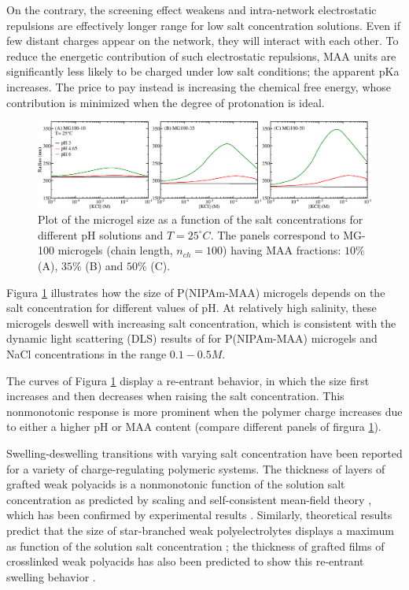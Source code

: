 On the contrary, the screening effect weakens and intra-network electrostatic repulsions are effectively longer range for low salt concentration solutions.
Even if few distant charges appear on the network, they will interact with each other.
To reduce the energetic contribution of such electrostatic repulsions, MAA units are significantly less likely to be charged under low salt conditions;
the apparent pKa increases.
The price to pay instead is increasing the chemical free energy, whose contribution is minimized when the degree of protonation is ideal.


\begin{figure}[!htb]
	\centering
	\includegraphics[width=1\linewidth]{Figures/graph-gel/R-cs.png}
	\caption{Plot of the microgel size as a function of the salt concentrations for different pH solutions and $T=25 ^\circ C$.
		The panels correspond to MG-100 microgels (chain length, $n_{ch}=100$) having MAA fractions: $10\%$ (A), $35\%$ (B) and $50\%$ (C).}
	\label{fig:R-cs}
\end{figure}




Figura \ref{fig:R-cs} illustrates how the size of P(NIPAm-MAA) microgels depends on the salt concentration for different values of pH.
At relatively high salinity, these microgels deswell with increasing salt concentration, which is consistent with the dynamic light scattering (DLS) results of   for P(NIPAm-MAA) microgels and NaCl concentrations in the range $0.1-0.5 M$.

The curves of Figura \ref{fig:R-cs} display a re-entrant behavior, in which the size first increases and then decreases when raising the salt concentration.
This nonmonotonic response is more prominent when the polymer charge increases due to either a higher pH or MAA content (compare different panels of firgura \ref{fig:R-cs}).



Swelling-deswelling transitions with varying salt concentration have been reported for a variety of charge-regulating polymeric systems.
The thickness of layers of grafted weak polyacids is a nonmonotonic function of the solution salt concentration as predicted by scaling and self-consistent mean-field theory , which has been confirmed by experimental results \addcite[Wu2007].
Similarly, theoretical results predict that the size of star-branched weak polyelectrolytes displays a maximum as function of the solution salt concentration ; 
the thickness of grafted films of crosslinked weak polyacids has also been predicted to show this re-entrant swelling behavior .



